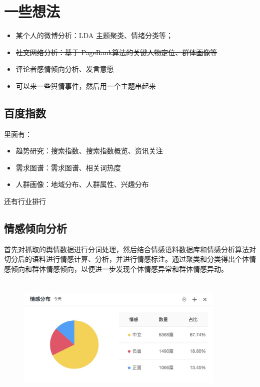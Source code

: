 \documentclass[11pt,a4paper,utf8]{article}
\begin{document}
  

\section{一些想法}
\begin{itemize}
    \item 某个人的微博分析：LDA 主题聚类、情绪分类等；
    \item \sout{社交网络分析：基于 PageRank算法的关键人物定位、群体画像等}
    \item 评论者感情倾向分析、发言意愿
    \item 可以来一些舆情事件，然后用一个主题串起来 
\end{itemize}   
   
\subsection{百度指数}
里面有：
\begin{itemize}
    \item 趋势研究：搜索指数、搜索指数概览、资讯关注
    \item 需求图谱：需求图谱、相关词热度
    \item 人群画像：地域分布、人群属性、兴趣分布
\end{itemize} 
还有行业排行
 
\subsection{情感倾向分析}
首先对抓取的舆情数据进行分词处理，然后结合情感语料数据库和情感分析算法对切分后的语料进行情感计算、分析，并进行情感标注。通过聚类和分类得出个体情感倾向和群体情感倾向，以便进一步发现个体情感异常和群体情感异动。 
\begin{figure}[H]
    \centering
    \includegraphics[width=10cm,height=6cm]{images/情感分布.jpg}   
\end{figure}  
\end{document}

